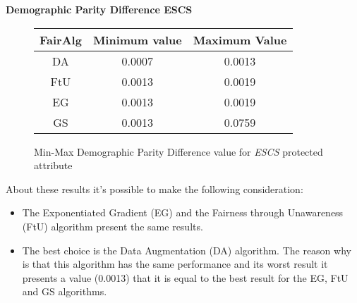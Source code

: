 \newpage
\textbf{Demographic Parity Difference ESCS}
\begin{figure}[H]
    \centering
    \begin{tabular}{|c|c|c|}
        \hline
        \textbf{FairAlg} & \textbf{Minimum value} & \textbf{Maximum Value} \\
        \hline
        DA & 0.0007 & 0.0013 \\
        \hline
        FtU & 0.0013 & 0.0019 \\
        \hline
        EG & 0.0013 & 0.0019 \\
        \hline
        GS & 0.0013 & 0.0759 \\
        \hline
    \end{tabular}
    \caption{Min-Max Demographic Parity Difference value for \emph{ESCS} protected attribute}
\end{figure}

About these results it's possible to make the following consideration:

\begin{itemize}
    \item The Exponentiated Gradient (EG) and the Fairness through Unawareness (FtU) algorithm present the same results.

    \item The best choice is the Data Augmentation (DA) algorithm. The reason why is that this algorithm has the same performance and its worst result it presents a value (0.0013) that it is equal to the best result for the EG, FtU and GS algorithms.
\end{itemize}